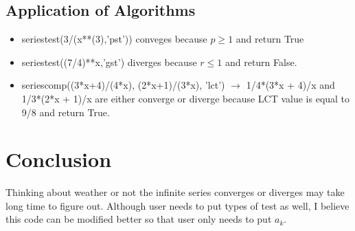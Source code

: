 \documentclass[12pt]{article}
\begin{document}
\subsection{Application of Algorithms}
\begin{itemize}
\item seriestest(3/(x**(3),'pst')) conveges because $p\ge 1$ and return True
\item seriestest((7/4)**x,'gst') diverges because $r\le 1$ and return False.
\item seriescomp((3*x+4)/(4*x), (2*x+1)/(3*x), 'lct') $\to$ 1/4*(3*x + 4)/x and 1/3*(2*x + 1)/x are either converge or diverge because LCT value is equal to 9/8 and return True.
\end{itemize}
\section{Conclusion}
Thinking about weather or not the infinite series converges or diverges may take long time to figure out. Although user needs to put types of test as well, I believe this code can be modified better so that user only needs to put $a_k$.
\end{document}
